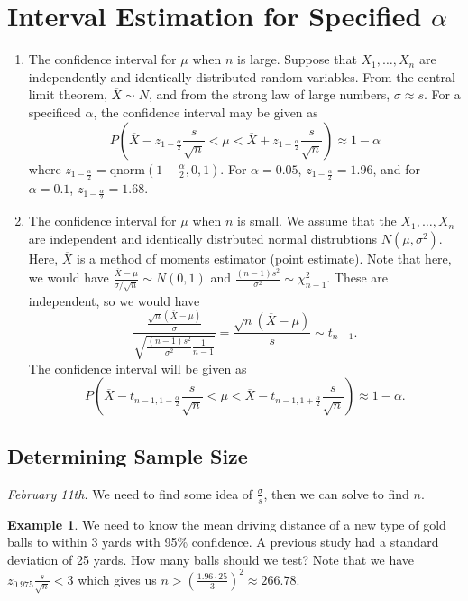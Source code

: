 \documentclass[15pt,a4paper]{book}
\theoremstyle{definition}
\newtheorem{example}[theorem]{Example}
\begin{document}
\section{Interval Estimation for Specified $\alpha$}
\begin{enumerate}
    \item The confidence interval for $\mu$ when $n$ is large. Suppose that $X_{1},\ldots,X_{n}$ are independently and identically distributed random variables. From the central limit theorem, $\overline{X} \sim N$, and from the strong law of large numbers, $\sigma \approx s$. For a specificed $\alpha$, the confidence interval may be given as
    \begin{equation}
        P(\overline{X}-z_{1-\frac{\alpha}{2}} \frac{s}{\sqrt{n}} < \mu < \overline{X}+z_{1-\frac{\alpha}{2}} \frac{s}{\sqrt{n}}) \approx 1-\alpha
    \end{equation}
    where $z_{1-\frac{\alpha}{2}} = \text{qnorm}(1-\frac{\alpha}{2}, 0, 1)$. For $\alpha = 0.05$, $z_{1-\frac{\alpha}{2}} = 1.96$, and for $\alpha = 0.1$, $z_{1-\frac{\alpha}{2}} = 1.68$.
    
    \item The confidence interval for $\mu$ when $n$ is small. We assume that the $X_{1},\ldots,X_{n}$ are independent and identically distrbuted normal distrubtions $N(\mu,\sigma^{2})$. Here, $\overline{X}$ is a method of moments estimator (point estimate). Note that here, we would have $\frac{\overline{X}-\mu}{\sigma/\sqrt{n}} \sim N(0,1)$ and $\frac{(n-1)s^{2}}{\sigma^{2}} \sim \chi_{n-1}^{2}$. These are independent, so we would have
    \begin{equation}
        \dfrac{\frac{\sqrt{n} (\overline{X}-\mu)}{\sigma}}{\sqrt{\frac{(n-1)s^{2}}{\sigma^{2}} \frac{1}{n-1}}} = \frac{\sqrt{n}(\overline{X}-\mu)}{s} \sim t_{n-1}.
    \end{equation}
    The confidence interval will be given as
    \begin{equation}
        P(\overline{X}-t_{n-1,1-\frac{\alpha}{2}}\frac{s}{\sqrt{n}} < \mu < \overline{X}-t_{n-1,1+\frac{\alpha}{2}}\frac{s}{\sqrt{n}}) \approx 1 - \alpha.
    \end{equation}
\end{enumerate}

\subsection{Determining Sample Size}
\textit{February 11th.}
We need to find some idea of $\frac{\sigma}{s}$, then we can solve to find $n$.
\begin{example}
    We need to know the mean driving distance of a new type of gold balls to within 3 yards with 95\% confidence. A previous study had a standard deviation of 25 yards. How many balls should we test? Note that we have $z_{0.975} \frac{s}{\sqrt{n}} < 3$ which gives us $n > (\frac{1.96 \cdot 25}{3})^{2} \approx 266.78$.
\end{example}
\end{document}
